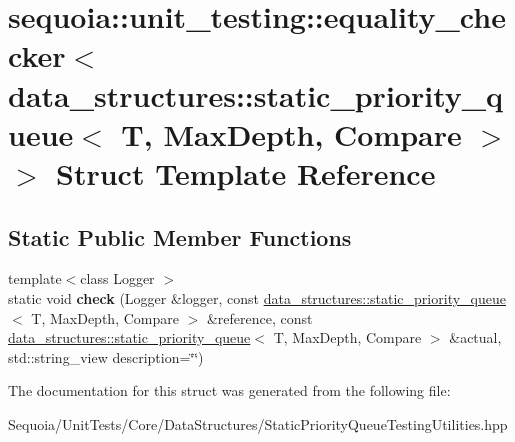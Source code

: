 \hypertarget{structsequoia_1_1unit__testing_1_1equality__checker_3_01data__structures_1_1static__priority__qu3481985d5305c2115e85eb68904d9392}{}\section{sequoia\+::unit\+\_\+testing\+::equality\+\_\+checker$<$ data\+\_\+structures\+::static\+\_\+priority\+\_\+queue$<$ T, Max\+Depth, Compare $>$ $>$ Struct Template Reference}
\label{structsequoia_1_1unit__testing_1_1equality__checker_3_01data__structures_1_1static__priority__qu3481985d5305c2115e85eb68904d9392}
\subsection*{Static Public Member Functions}
\begin{DoxyCompactItemize}
\item 
\mbox{\label{structsequoia_1_1unit__testing_1_1equality__checker_3_01data__structures_1_1static__priority__qu3481985d5305c2115e85eb68904d9392_a830e79da82ba3166c854a15b776ee8e3}} 
{\footnotesize template$<$class Logger $>$ }\\static void {\bfseries check} (Logger \&logger, const \mbox{\hyperlink{classsequoia_1_1data__structures_1_1static__priority__queue}{data\+\_\+structures\+::static\+\_\+priority\+\_\+queue}}$<$ T, Max\+Depth, Compare $>$ \&reference, const \mbox{\hyperlink{classsequoia_1_1data__structures_1_1static__priority__queue}{data\+\_\+structures\+::static\+\_\+priority\+\_\+queue}}$<$ T, Max\+Depth, Compare $>$ \&actual, std\+::string\+\_\+view description=\char`\"{}\char`\"{})
\end{DoxyCompactItemize}


The documentation for this struct was generated from the following file\+:\begin{DoxyCompactItemize}
\item 
Sequoia/\+Unit\+Tests/\+Core/\+Data\+Structures/Static\+Priority\+Queue\+Testing\+Utilities.\+hpp\end{DoxyCompactItemize}
